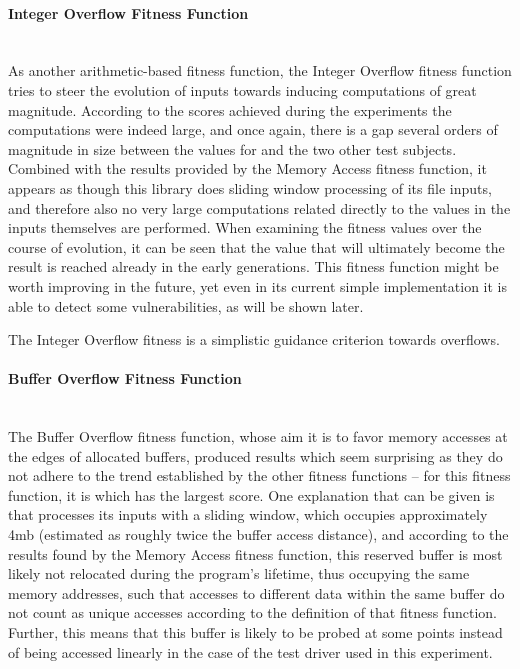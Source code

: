 \paragraph{Integer Overflow Fitness Function} ~\\
As another arithmetic-based fitness function, the Integer Overflow fitness function tries to steer the
evolution of inputs towards inducing computations of great magnitude. According to the scores achieved during
the experiments the computations were indeed large, and once again, there is a gap several orders of
magnitude in size between the values for \libpcap and the two other test subjects. Combined with the
results provided by the Memory Access fitness function, it appears as though this library does sliding window
processing of its file inputs, and therefore also no very large computations related directly to the values in
the inputs themselves are performed. When examining the fitness values over the course of evolution, it can
be seen that the value that will ultimately become the result is reached already in the early generations.
This fitness function might be worth improving in the future, yet even in its current simple implementation it
is able to detect some vulnerabilities, as will be shown later.

\begin{mdframed}
\centering
The Integer Overflow fitness is a simplistic guidance criterion towards overflows.
\end{mdframed}

\paragraph{Buffer Overflow Fitness Function} ~\\
The Buffer Overflow fitness function, whose aim it is to favor memory accesses at the edges of allocated
buffers, produced results which seem surprising as they do not adhere to the trend established by the other
fitness functions -- for this fitness function, it is \libpcap which has the largest score. One explanation
that can be given is that \libpcap processes its inputs with a sliding window, which occupies approximately
4mb (estimated as roughly twice the buffer access distance), and according to the results found by the Memory
Access fitness function, this reserved buffer is most likely not relocated during the program's lifetime, thus
occupying the same memory addresses, such that accesses to different data within the same buffer do not count
as unique accesses according to the definition of that fitness function. Further, this means that this buffer
is likely to be probed at some points instead of being accessed linearly in the case of the test driver used
in this experiment. 

